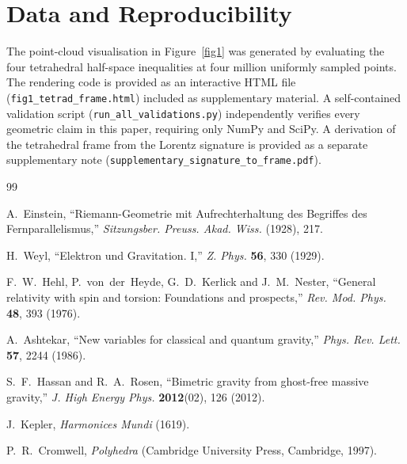 \documentclass[twocolumn]{iopjournal}
\begin{document}

\section*{Data and Reproducibility}

The point-cloud visualisation in Figure~\ref{fig1} was generated by
evaluating the four tetrahedral half-space inequalities at four million
uniformly sampled points. The rendering code is provided as an interactive
HTML file (\texttt{fig1\_tetrad\_frame.html}) included
as supplementary material. A self-contained validation script
(\texttt{run\_all\_validations.py}) independently verifies every geometric
claim in this paper, requiring only NumPy and SciPy. A derivation of the
tetrahedral frame from the Lorentz signature is provided as a separate
supplementary note (\texttt{supplementary\_signature\_to\_frame.pdf}).


\begin{thebibliography}{99}

A.~Einstein,
``Riemann-Geometrie mit Aufrechterhaltung des Begriffes des Fernparallelismus,''
\textit{Sitzungsber. Preuss. Akad. Wiss.} (1928), 217.

H.~Weyl,
``Elektron und Gravitation. I,''
\textit{Z. Phys.} \textbf{56}, 330 (1929).

F.~W.~Hehl, P.~von~der~Heyde, G.~D.~Kerlick and J.~M.~Nester,
``General relativity with spin and torsion: Foundations and prospects,''
\textit{Rev. Mod. Phys.} \textbf{48}, 393 (1976).

A.~Ashtekar,
``New variables for classical and quantum gravity,''
\textit{Phys. Rev. Lett.} \textbf{57}, 2244 (1986).

S.~F.~Hassan and R.~A.~Rosen,
``Bimetric gravity from ghost-free massive gravity,''
\textit{J. High Energy Phys.} \textbf{2012}(02), 126 (2012).

J.~Kepler,
\textit{Harmonices Mundi} (1619).

P.~R.~Cromwell,
\textit{Polyhedra}
(Cambridge University Press, Cambridge, 1997).

\end{thebibliography}
\end{document}
